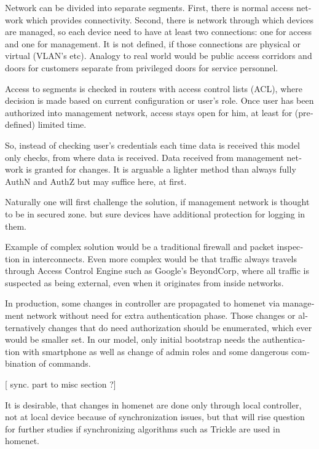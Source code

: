 \documentclass[12pt,a4paper,english]{tutthesis}
\begin{document}
\begin{otherlanguage}{english}
Network can be divided into separate segments. 
First, there is normal access network which provides
connectivity. Second, there is network through which devices are
managed, so each device need to have at least two connections: one for
access and one for management. It is not defined, if those connections
are physical or virtual (VLAN's etc). 
Analogy to real world would be public access corridors and doors for
customers separate from privileged doors for service personnel.

Access to segments is checked in routers with access control lists
(ACL), where decision is made based on current configuration or user's
role.  Once user has been authorized into management network, access
stays open for him, at least for (predefined) limited time.

So, instead of checking user's credentials each time data is received
this model only checks, from where data is received. 
Data received from management network is granted for changes.
It is arguable a lighter method than always
fully AuthN and AuthZ but may suffice here, at first.

Naturally one will first challenge the solution, if
management network is thought to be in secured zone.
but sure devices have additional protection for logging in them. 


Example of complex solution would be a traditional firewall and packet
inspection in interconnects. Even more complex would be that traffic
always travels through Access Control Engine such as Google's
BeyondCorp\cite{2014-beyondcorp}, where all
traffic is suspected as being external, even when it originates from inside networks.


In production, some changes in controller are propagated to homenet
via management network without need for extra authentication phase.  
Those changes or alternatively changes that do need authorization
should be enumerated, which ever would be smaller set. In our model,
only initial bootstrap needs the authentication with smartphone as
well as change of admin roles and some dangerous combination of commands.

[ sync. part to misc section ?]

It is desirable, that changes in homenet are done only through
local controller, not at local device because of
synchronization issues,
but that will rise question for further studies if synchronizing
algorithms such as Trickle are used in homenet.





\end{otherlanguage}
\end{document}
